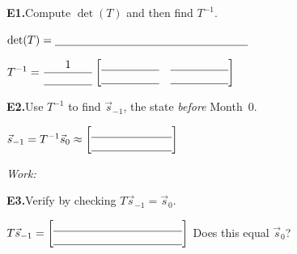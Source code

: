 \documentclass[10pt]{article}
\begin{document}
\begin{tcolorbox}[colback=greenbg, colframe=greenacc,
    title=\textbf{Tier E --- Extend},
    fonttitle=\bfseries, arc=2mm, left=3mm, right=3mm, top=2mm, bottom=2mm]

\textbf{E1.}\quad Compute $\det(T)$ and then find $T^{-1}$.

\vspace{4pt}
$\det(T) = \blank{6cm}$

\vspace{6pt}
$T^{-1} = \dfrac{1}{\blank{1.5cm}}\begin{bmatrix}\blank{1.8cm} & \blank{1.8cm} \\ \blank{1.8cm} & \blank{1.8cm}\end{bmatrix}$

\vspace{10pt}
\textbf{E2.}\quad Use $T^{-1}$ to find $\vec{s}_{-1}$, the state \emph{before} Month~0.

\vspace{6pt}
$\vec{s}_{-1} = T^{-1}\vec{s}_0 \approx \begin{bmatrix}\blank{2.5cm} \\ \blank{2.5cm}\end{bmatrix}$

\vspace{6pt}
\textit{Work:} \writeline

\vspace{10pt}
\textbf{E3.}\quad Verify by checking $T\vec{s}_{-1} = \vec{s}_0$.

\vspace{4pt}
$T\vec{s}_{-1} = \begin{bmatrix}\blank{4cm}\\\blank{4cm}\end{bmatrix}$ \quad Does this equal $\vec{s}_0$? \blank{2cm}

\end{tcolorbox}
\end{document}
